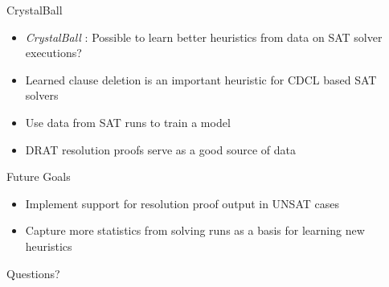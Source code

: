 \documentclass{beamer}
\begin{document}
\begin{frame}{CrystalBall}
    \begin{itemize}
        \item \textit{CrystalBall} \cite{2019sooscrystalball}: Possible to learn better heuristics from data on SAT solver executions? 
        \item Learned clause deletion is an important heuristic for CDCL based SAT solvers
        \item Use data from SAT runs to train a model
        \item DRAT resolution proofs serve as a good source of data
    \end{itemize}
\end{frame}

\begin{frame}{Future Goals}
    \begin{itemize}
        \item Implement support for resolution proof output in UNSAT cases
        \item Capture more statistics from solving runs as a basis for learning new heuristics
    \end{itemize}
\end{frame}

\begin{frame}{}
    \begin{center}
        \Large
        Questions?
    \end{center}
\end{frame}



\end{document}
